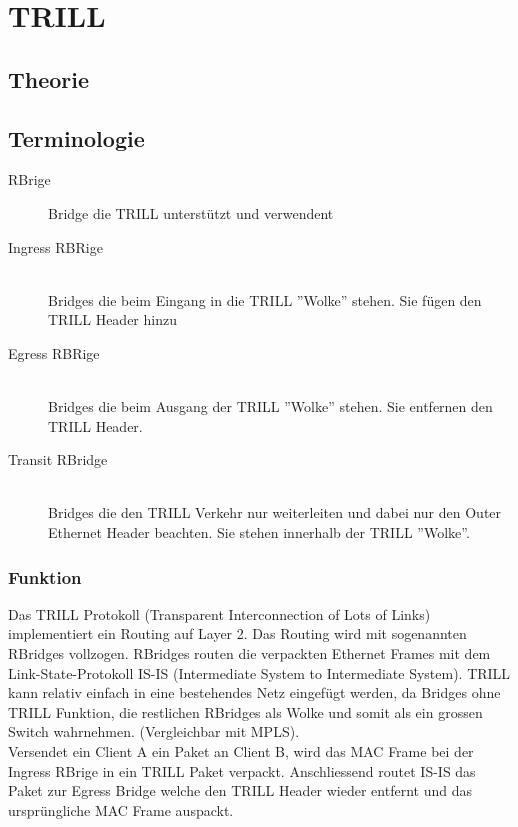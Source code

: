 \section{TRILL}

\subsection{Theorie}
\subsection{Terminologie}
\begin{description}
	\item[RBrige] Bridge die TRILL unterstützt und verwendent
	\item[Ingress RBRige] \hfill \\
	Bridges die beim Eingang in die TRILL ''Wolke'' stehen. Sie fügen den TRILL Header hinzu
	\item[Egress RBRige] \hfill \\
	Bridges die beim Ausgang der TRILL ''Wolke'' stehen. Sie entfernen den TRILL Header.
	\item[Transit RBridge]  \hfill \\
	Bridges die den TRILL Verkehr nur weiterleiten und dabei nur den Outer Ethernet Header beachten. Sie stehen innerhalb der TRILL ''Wolke''.
\end{description}

\subsubsection{Funktion} %
Das TRILL Protokoll  (Transparent Interconnection of Lots of Links) implementiert ein Routing auf Layer 2. Das Routing wird mit sogenannten RBridges vollzogen. RBridges routen die verpackten Ethernet Frames mit dem Link-State-Protokoll IS-IS (Intermediate System to Intermediate System). TRILL kann relativ einfach in eine bestehendes Netz eingefügt werden, da Bridges ohne TRILL Funktion, die restlichen RBridges als Wolke und somit als ein grossen Switch wahrnehmen. (Vergleichbar mit MPLS). \\ 

Versendet ein Client A ein Paket an Client B, wird das MAC Frame bei der Ingress RBrige in ein TRILL Paket verpackt. Anschliessend routet IS-IS das Paket zur Egress Bridge welche den TRILL Header wieder entfernt und das ursprüngliche MAC Frame auspackt.  \\

